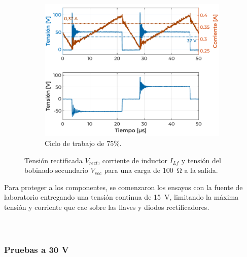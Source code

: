 \begin{figure}[h]
\begin{subfigure}{0.48\textwidth}
        \label{fig:ensayo_concarga15V_DC50}
    \end{subfigure}
    \hfill\vspace{1em}
    \begin{subfigure}{0.48\textwidth}
        \centering
        \includegraphics[width=\textwidth]{Imagenes/Con Carga - Caso 5.pdf}
        \caption{Ciclo de trabajo de 75\%.}
        \label{fig:ensayo_concarga15V_DC75}
    \end{subfigure}
    \caption{Tensión rectificada $V_{rect}$, corriente de inductor $I_{Lf}$ y tensión del bobinado secundario $V_{sec}$ para una carga de \SI[]{100}{\ohm} a la salida.}
    \label{fig:ensayo_concarga15V}
\end{figure}

Para proteger a los componentes, se comenzaron los ensayos con la fuente de laboratorio entregando una tensión continua de \SI[]{15}{\volt}, limitando la máxima tensión y corriente que cae sobre las llaves y diodos rectificadores.\\

\lipsum[3]\\

\lipsum[4]\\

\subsubsection{Pruebas a 30 V}

